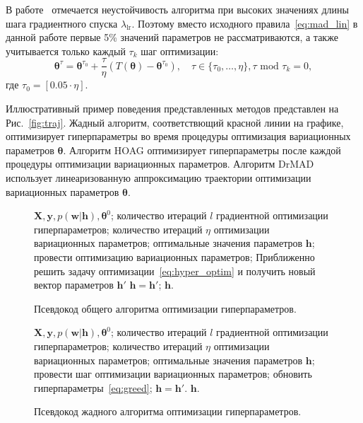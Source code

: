 В работе~\cite{hyper_mad} отмечается неустойчивость алгоритма при высоких значениях длины шага градиентного спуска $ \lambda_{\text{lr}}$. Поэтому вместо исходного правила~\eqref{eq:mad_lin} в данной работе первые 5\% значений параметров не рассматриваются, а также учитывается только каждый $\tau_k$ шаг оптимизации:
\begin{equation}
\label{eq:mad_lin2}
\boldsymbol{\theta}^\tau = \boldsymbol{\theta}^{\tau_0} + \frac{\tau}{\eta} (T(\boldsymbol{\theta})-\boldsymbol{\theta}^{\tau_0}), \quad \tau \in \{\tau_0,\dots,\eta\}, \tau \text{ mod } \tau_k = 0,
\end{equation}
где $\tau_0 = [0.05 \cdot \eta]$.

Иллюстративный пример поведения представленных методов представлен на Рис.~\ref{fig:traj}. Жадный алгоритм, соответствющий красной линии на графике, оптимизирует гиперпараметры во время процедуры оптимизация вариационных параметров $\boldsymbol{\theta}$. Алгоритм HOAG оптимизирует гиперпараметры после каждой процедуры оптимизации вариационных параметров. Алгоритм DrMAD использует линеаризованную аппроксимацию траектории оптимизации вариационных параметров $\boldsymbol{\theta}$. 

\begin{figure}
    \begin{algorithmic}[1]
\REQUIRE $\mathbf{X}, \mathbf{y}, p(\mathbf{w}|\mathbf{h}), \boldsymbol{\theta}^0$;
\REQUIRE количество итераций $l$ градиентной оптимизации гиперпараметров; 
\REQUIRE количество итераций $\eta$ оптимизации вариационных параметров;
\ENSURE оптимальные значения параметров $\mathbf{h}$;
\STATE провести оптимизацию вариационных параметров;
\STATE Приближенно решить задачу оптимизации~\eqref{eq:hyper_optim} и получить новый вектор параметров $\mathbf{h}'$ 
\STATE $\mathbf{h} = \mathbf{h}'$;
\ENDFOR
\RETURN $\mathbf{h}$.
\end{algorithmic}
\caption{Псевдокод общего алгоритма оптимизации гиперпараметров.}
\label{alg:hyperparam_optim}

\end{figure}

\begin{figure}
         \begin{algorithmic}[1]
\REQUIRE $\mathbf{X}, \mathbf{y}, p(\mathbf{w}|\mathbf{h}), \boldsymbol{\theta}^0$;
\REQUIRE количество итераций $l$ градиентной оптимизации гиперпараметров; 
\REQUIRE количество итераций $\eta$ оптимизации вариационных параметров;
\ENSURE оптимальные значения параметров $\mathbf{h}$;
\STATE провести шаг оптимизации вариационных параметров;
\STATE обновить гиперпараметры~\eqref{eq:greed};
\STATE $\mathbf{h} = \mathbf{h}'$.
\ENDFOR
\ENDFOR
\RETURN $\mathbf{h}$.
\end{algorithmic}
\caption{Псевдокод жадного алгоритма оптимизации гиперпараметров.}
\label{alg:greedy}

\end{figure}


